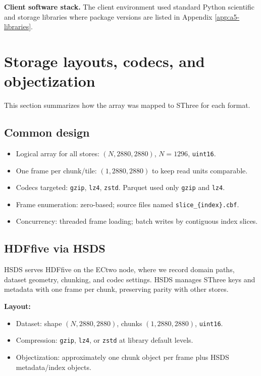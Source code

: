 \documentclass[nomenclature, english, bibtex]{kththesis}
\numberwithin{listing}{chapter}
\begin{document}
\textbf{Client software stack.} The client environment used standard Python scientific and storage libraries where package versions are listed in Appendix \ref{app:a5-libraries}.


\section{Storage layouts, codecs, and objectization}
This section summarizes how the array was mapped to \gls{SThree} for each format.

\subsection{Common design}
\begin{itemize}
  \item Logical array for all stores: $(N,2880,2880)$, $N{=}1296$, \texttt{uint16}.
  \item One frame per chunk/tile: $(1,2880,2880)$ to keep read units comparable.
  \item Codecs targeted: \texttt{gzip}, \texttt{lz4}, \texttt{zstd}. Parquet used only \texttt{gzip} and \texttt{lz4}.
  \item Frame enumeration: zero-based; source files named \texttt{slice\_\{index\}.cbf}.
  \item Concurrency: threaded frame loading; batch writes by contiguous index slices.
\end{itemize}


\subsection{\texorpdfstring{\gls{HDFfive} via \gls{HSDS}}{HDF5 via HSDS}} \gls{HSDS} serves \gls{HDFfive} on the \gls{ECtwo} node, where we record domain paths, dataset geometry, chunking, and codec settings. \gls{HSDS} manages \gls{SThree} keys and metadata with one frame per chunk, preserving parity with other stores.

\textbf{Layout:}
\begin{itemize}
  \item Dataset: shape $(N,2880,2880)$, chunks $(1,2880,2880)$, \texttt{uint16}.
  \item Compression: \texttt{gzip}, \texttt{lz4}, or \texttt{zstd} at library default levels.
  \item Objectization: approximately one chunk object per frame plus \gls{HSDS} metadata/index objects.
\end{itemize}
\end{document}
